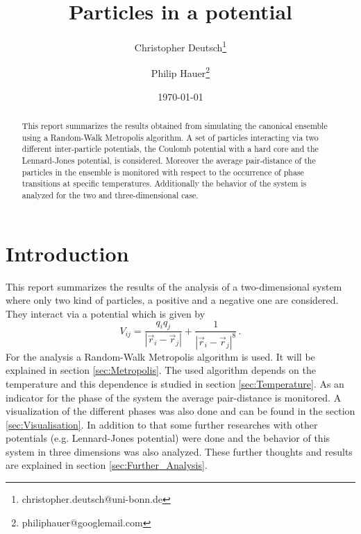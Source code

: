 \documentclass[11pt, a4paper]{article}
\title{Particles in a potential}
\author{Christopher Deutsch\footnote{christopher.deutsch@uni-bonn.de} \and Philip Hauer\footnote{philiphauer@googlemail.com}}
\date{\today}
\numberwithin{equation}{section}
\begin{document}
\begin{titlepage}

\maketitle

\begin{abstract}
\noindent
This report summarizes the results obtained from simulating the canonical ensemble using a Random-Walk Metropolis algorithm.
A set of particles interacting via two different inter-particle potentials, the Coulomb potential with a hard core and the Lennard-Jones potential, is considered.
Moreover the average pair-distance of the particles in the ensemble is monitored with respect to the occurrence of phase transitions at specific temperatures.
Additionally the behavior of the system is analyzed for the two and three-dimensional case.
\end{abstract}

\end{titlepage}

\tableofcontents
\newpage


\section{Introduction}
This report summarizes the results of the analysis of a two-dimensional system where only two kind of particles, a positive and a negative one are considered.
They interact via a potential which is given by
\begin{equation}
V_{ij} = \frac{q_i q_j}{\left| \vec{r}_i - \vec{r}_j \right|} + \frac{1}{\left| \vec{r}_i - \vec{r}_j \right|^8} \, \text{.} \label{Eq:Potential}
\end{equation}
For the analysis a Random-Walk Metropolis algorithm is used. It will be explained in section \ref{sec:Metropolis}.
The used algorithm depends on the temperature and this dependence is studied in section \ref{sec:Temperature}.
As an indicator for the phase of the system the average pair-distance is monitored.
A visualization of the different phases was also done and can be found in the section \ref{sec:Visualisation}.
In addition to that some further researches with other potentials (e.g. Lennard-Jones potential) were done and the behavior of this system in three dimensions was also analyzed.
These further thoughts and results are explained in section \ref{sec:Further_Analysis}.
\end{document}
